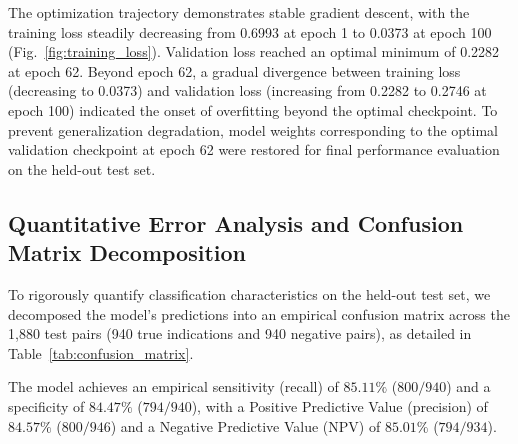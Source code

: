 \documentclass[conference,a4paper]{IEEEtran}
\begin{document}
The optimization trajectory demonstrates stable gradient descent, with the training loss steadily decreasing from 0.6993 at epoch 1 to 0.0373 at epoch 100 (Fig.~\ref{fig:training_loss}). Validation loss reached an optimal minimum of 0.2282 at epoch 62. Beyond epoch 62, a gradual divergence between training loss (decreasing to 0.0373) and validation loss (increasing from 0.2282 to 0.2746 at epoch 100) indicated the onset of overfitting beyond the optimal checkpoint. To prevent generalization degradation, model weights corresponding to the optimal validation checkpoint at epoch 62 were restored for final performance evaluation on the held-out test set.

\subsection{Quantitative Error Analysis and Confusion Matrix Decomposition}
To rigorously quantify classification characteristics on the held-out test set, we decomposed the model's predictions into an empirical confusion matrix across the 1,880 test pairs (940 true indications and 940 negative pairs), as detailed in Table~\ref{tab:confusion_matrix}.

\begin{table}[!t]
    \centering
    \renewcommand{\arraystretch}{1.2}
    \caption{Empirical Confusion Matrix on Held-Out Test Set (1,880 Samples)}
    \label{tab:confusion_matrix}
\end{table}

The model achieves an empirical sensitivity (recall) of $85.11\%$ ($800/940$) and a specificity of $84.47\%$ ($794/940$), with a Positive Predictive Value (precision) of $84.57\%$ ($800/946$) and a Negative Predictive Value (NPV) of $85.01\%$ ($794/934$). 
\end{document}
